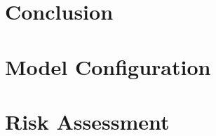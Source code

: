 \documentclass[12pt]{report}
\begin{document}
\chapter{Conclusion}



\printbibliography[heading=bibintoc]{}



\newpage
 

\begin{appendices}
\chapter{Model Configuration}

\chapter{Risk Assessment}


\end{appendices}
\end{document}
